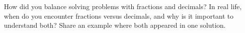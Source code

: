 \documentclass[12pt]{article}
\begin{document}
\vspace{1em}

\begin{tcolorbox}[colframe=black!60, colback=white, 
coltitle=black, colbacktitle=black!15, fonttitle=\bfseries\Large, 
title=Reflection, halign title=center, left=10pt, right=10pt, top=10pt, bottom=100pt]
How did you balance solving problems with fractions and decimals? In real life, when do you encounter fractions versus decimals, and why is it important to understand both? Share an example where both appeared in one solution.
\end{tcolorbox}
\end{document}
